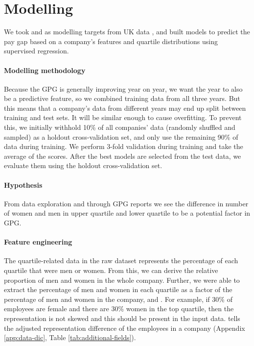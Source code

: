 \section{Modelling}
\label{sec:modelling}
We took  and   as modelling targets from UK data \cite{gov-uk-gpg-data}, and built models to
predict the pay gap based on a company's features and quartile distributions using supervised regression.  

\paragraph{Modelling methodology}
Because the GPG is generally improving year on year,
we want the year to also be a predictive feature, so we combined training data from all three years. But this means that a company's data from different years may end up split between training and test sets. It will  be similar enough to cause overfitting. To prevent this, we initially withhold 10\% of all companies' data (randomly shuffled and sampled) as a holdout cross-validation set, and only use the remaining 90\% of data during training. We perform 3-fold validation during training and take the average of the scores. After the best models are selected from the test data, we evaluate them using the holdout cross-validation set. 

\paragraph*{Hypothesis} From data exploration and through GPG reports we see the difference in number of women and men in upper quartile and lower quartile to be a potential factor in GPG.

\paragraph*{Feature engineering} The quartile-related data in the raw dataset represents the percentage of each quartile that were men or women. From this, we can derive the relative proportion of men and women in the whole company.
Further, we were able to extract the percentage of men and women in each quartile as a factor of the percentage of men and women in the company,  and . For example, if 30\% of employees are female and there are 30\% women in the top quartile, then the representation is not skewed and this should be present in the input data.
 tells the adjusted representation difference of the employees in a company (Appendix \ref{app:data-dic}, Table \ref{tab:additional-fields}).

